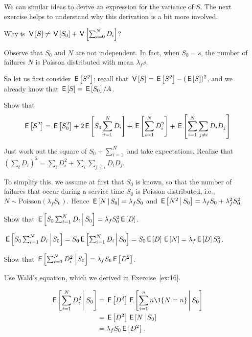 We can similar ideas to derive an expression for the variance of $S$. The next exercise helps to  understand why this derivation is a bit more involved.
\begin{exercise}
  Why is $\,\mathsf{V}\left[S\right] \neq \,\mathsf{V}\left[S_0\right] + \,\mathsf{V}\left[\sum_{i=0}^N D_i\right]$?
  \begin{solution}
    Observe that $S_0$ and $N$ are not independent. In fact, when $S_0=s$, the number of failures $N$ is Poisson distributed with mean $\lambda_f s$. 
  \end{solution}
\end{exercise}

So let us first consider $\,\mathsf{E}\left[S^2\right]$; recall that $\,\mathsf{V}\left[S\right] = \,\mathsf{E}\left[S^2\right] - (\,\mathsf{E}\left[S\right])^2$, and we already know that $\,\mathsf{E}\left[S\right] = \,\mathsf{E}\left[S_0\right]/A$. 

\begin{exercise}
Show that 
\begin{equation*}
  \,\mathsf{E}\left[S^2\right] = \,\mathsf{E}\left[S_0^2\right] + 2\,\mathsf{E}\left[S_0 \sum_{i=1}^N D_i\right] + \,\mathsf{E}\left[\sum_{i=1}^N D_i^2\right] + \,\mathsf{E}\left[\sum_{i=1}^N \sum_{j\neq i} D_i D_j\right]
\end{equation*}
\begin{solution}
  Just work out the square of $S_0+\sum_{i=1}^N$ and take expectations. Realize that $(\sum_i D_i)^2 = \sum_i D_i^2 + \sum_i\sum_{j\neq i} D_i D_j$.  
\end{solution}
\end{exercise}

To simplify this, we  assume at first that $S_0$ is known, so that the number of failures that occur during a service time $S_0$ is Poisson distributed, i.e.,  $N\sim \text{Poisson}(\lambda_f S_0)$.  Hence $\,\mathsf{E}\left[N\,\middle|\, S_0\right] = \lambda_f S_0$ and $\,\mathsf{E}\left[N^2\,\middle|\, S_0\right]= \lambda_f S_0 + \lambda_f^2 S_0^2$. 

\begin{exercise}
  Show that $\,\mathsf{E}\left[S_0 \sum_{i=1}^N D_i\,\middle|\, S_0\right] = \lambda_f S_0^2 \,\mathsf{E}\left[D\right]$.
\begin{solution}
$\,\mathsf{E}\left[S_0 \sum_{i=1}^N D_i\,\middle|\, S_0\right] = 
S_0 \,\mathsf{E}\left[\sum_{i=1}^N D_i\,\middle|\, S_0\right] = S_0 \,\mathsf{E}\left[D\right] \,\mathsf{E}\left[N\right] = \lambda_f \,\mathsf{E}\left[D\right] S_0^2$.
\end{solution}
\end{exercise}

\begin{exercise}
Show that $\,\mathsf{E}\left[\sum_{i=1}^N D_i^2\,\middle|\, S_0\right] = \lambda_f S_0 \,\mathsf{E}\left[D^2\right]$.
\begin{hint}
  Use Wald's equation, which we derived in Exercise~\ref{ex:16}.
\end{hint}
\begin{solution}
  \begin{align*}
    \E{\sum_{i=1}^N D_i^2\given S_0} 
&= \E{D^2}\E{ \sum_{i=1}^n n \1{N=n}\given S_0}\\
&= \E{D^2} \E{N\given S_0} \\
&= \lambda_f S_0 \E{D^2}.
  \end{align*}
\end{solution}
\end{exercise}

